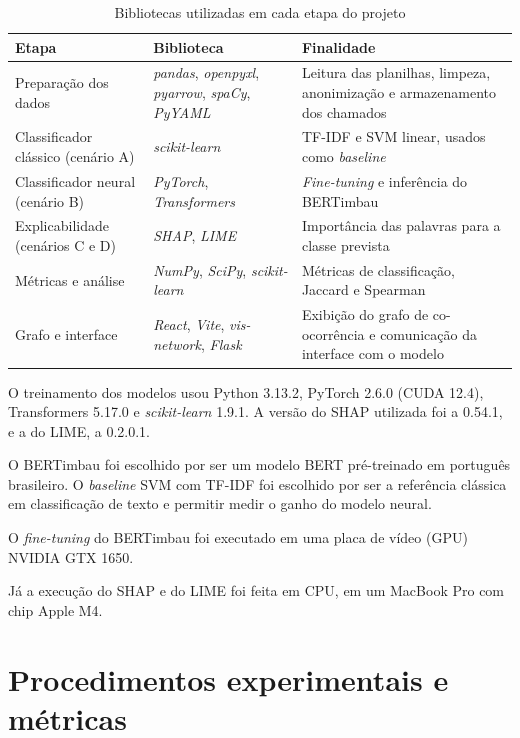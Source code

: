 \documentclass[
    12pt,                %
    openright,           %
    oneside,             %
    a4paper,             %
    english,             %
    brazil               %
]{abntex2}
\let\legendoriginal\legend
\renewcommand{\legend}[1]{\legendoriginal{\small #1}}
\begin{document}
\begin{table}[htb]
  \centering
  \caption{Bibliotecas utilizadas em cada etapa do projeto}
  \label{tab:ferramentas}
  \begin{tabular}{p{3.4cm}p{3.6cm}p{6.6cm}}
    \toprule
    Etapa & Biblioteca & Finalidade \\
    \midrule
    Preparação dos dados & \textit{pandas}, \textit{openpyxl}, \textit{pyarrow}, \textit{spaCy}, \textit{PyYAML} & Leitura das planilhas, limpeza, anonimização e armazenamento dos chamados \\
    Classificador clássico (cenário A) & \textit{scikit-learn} & TF-IDF e SVM linear, usados como \textit{baseline} \\
    Classificador neural (cenário B) & \textit{PyTorch}, \textit{Transformers} & \textit{Fine-tuning} e inferência do BERTimbau \\
    Explicabilidade (cenários C e D) & \textit{SHAP}, \textit{LIME} & Importância das palavras para a classe prevista \\
    Métricas e análise & \textit{NumPy}, \textit{SciPy}, \textit{scikit-learn} & Métricas de classificação, Jaccard e Spearman \\
    Grafo e interface & \textit{React}, \textit{Vite}, \textit{vis-network}, \textit{Flask} & Exibição do grafo de co-ocorrência e comunicação da interface com o modelo \\
    \bottomrule
  \end{tabular}
  \legend{Fonte: Elaborado pelos autores}
\end{table}

O treinamento dos modelos usou Python 3.13.2, PyTorch 2.6.0 (CUDA 12.4), Transformers 5.17.0 e \textit{scikit-learn} 1.9.1. A versão do SHAP utilizada foi a 0.54.1, e a do LIME, a 0.2.0.1.

O BERTimbau \cite{souza2020} foi escolhido por ser um modelo BERT pré-treinado em português brasileiro. O \textit{baseline} SVM com TF-IDF foi escolhido por ser a referência clássica em classificação de texto e permitir medir o ganho do modelo neural.

O \textit{fine-tuning} do BERTimbau foi executado em uma placa de vídeo (GPU) NVIDIA GTX 1650.

Já a execução do SHAP e do LIME foi feita em CPU, em um MacBook Pro com chip Apple M4.

\section{Procedimentos experimentais e métricas}
\end{document}

